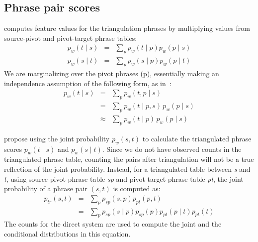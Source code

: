 \documentclass[11pt]{article}
\begin{document}
\subsection{Phrase pair scores}
\label{sec:phrase_scores}

 \cite{Utiyama:07} computes feature values for the triangulation phrases by multiplying values from source-pivot and pivot-target phrase tables:
	\begin{eqnarray} 
	    \label{eq:forward}
        p_w(t \mid s) &=& \sum_{p} p_w(t \mid p) p_w(p \mid s) \\
        \label{eq:backward}
        p_w(s \mid t) &=& \sum_{p} p_w(s \mid p) p_w(p \mid t)
	\end{eqnarray}
	We are marginalizing over the pivot phrases (p), essentially making an independence assumption of the following form, as in~\cite{Cohn:07}:  
	\begin{eqnarray*}
		p_w(t \mid s)&=&\sum_{p}{p_w(t, p \mid s)}\\
		&=& \sum_{p}{p_w(t \mid p, s)\,p_w(p \mid s)}\\
		&\approx& \sum_{p}{p_w(t \mid p)\,p_w(p \mid s)}
	\end{eqnarray*}

\label{sec:joint}
	\cite{Cohn:07} propose using the joint probability $p_{w}(s, t)$ to calculate the triangulated phrase scores $p_{w}(t \mid s)$ and $p_{w}(s \mid t)$. Since we do not have observed counts in the triangulated phrase table, counting the pairs after triangulation will not be a true reflection of the joint probability. Instead, for a triangulated table between \emph{s} and \emph{t}, using source-pivot phrase table \emph{sp} and pivot-target phrase table \emph{pt}, the joint probability of a phrase pair $(s, t)$ is computed as: 
	\begin{eqnarray*}
		p_{tr}(s, t) &=& \sum_{p}p_{sp}(s, p) p_{pt}(p, t) \\
				&=& \sum_{p}p_{sp}(s \mid p) p_{sp}(p) p_{pt}(p \mid t) p_{pt}(t)
	\end{eqnarray*} 
	The counts for the direct system are used to compute the joint and the conditional distributions in this equation.
	
\end{document}
